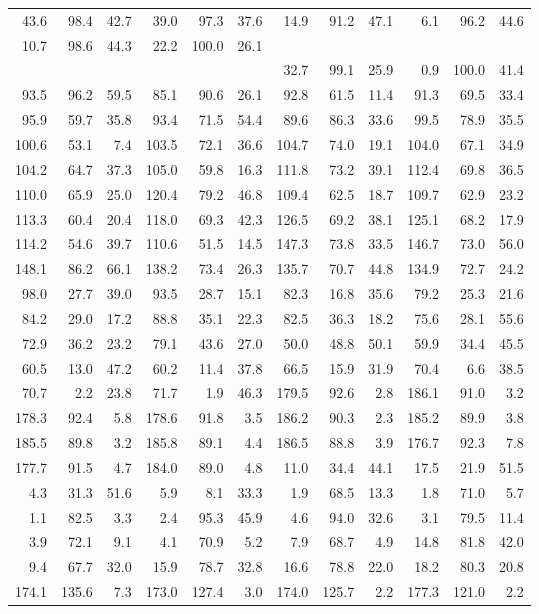 \documentclass[draft]{article}
\begin{document}
\begin{table}
\begin{center}
\begin{tabular}{rrrrrrrrrrrr}
 43.6& 98.4& 42.7& 39.0& 97.3& 37.6& 14.9& 91.2& 47.1&  6.1& 96.2& 44.6\\
 10.7& 98.6& 44.3& 22.2&100.0& 26.1\\
     &     &     &     &     &     & 32.7& 99.1& 25.9&  0.9&100.0& 41.4\\
 93.5& 96.2& 59.5& 85.1& 90.6& 26.1& 92.8& 61.5& 11.4& 91.3& 69.5& 33.4\\
 95.9& 59.7& 35.8& 93.4& 71.5& 54.4& 89.6& 86.3& 33.6& 99.5& 78.9& 35.5\\
100.6& 53.1&  7.4&103.5& 72.1& 36.6&104.7& 74.0& 19.1&104.0& 67.1& 34.9\\
104.2& 64.7& 37.3&105.0& 59.8& 16.3&111.8& 73.2& 39.1&112.4& 69.8& 36.5\\
110.0& 65.9& 25.0&120.4& 79.2& 46.8&109.4& 62.5& 18.7&109.7& 62.9& 23.2\\
113.3& 60.4& 20.4&118.0& 69.3& 42.3&126.5& 69.2& 38.1&125.1& 68.2& 17.9\\
114.2& 54.6& 39.7&110.6& 51.5& 14.5&147.3& 73.8& 33.5&146.7& 73.0& 56.0\\
148.1& 86.2& 66.1&138.2& 73.4& 26.3&135.7& 70.7& 44.8&134.9& 72.7& 24.2\\
 98.0& 27.7& 39.0& 93.5& 28.7& 15.1& 82.3& 16.8& 35.6& 79.2& 25.3& 21.6\\
 84.2& 29.0& 17.2& 88.8& 35.1& 22.3& 82.5& 36.3& 18.2& 75.6& 28.1& 55.6\\
 72.9& 36.2& 23.2& 79.1& 43.6& 27.0& 50.0& 48.8& 50.1& 59.9& 34.4& 45.5\\
 60.5& 13.0& 47.2& 60.2& 11.4& 37.8& 66.5& 15.9& 31.9& 70.4&  6.6& 38.5\\
 70.7&  2.2& 23.8& 71.7&  1.9& 46.3&179.5& 92.6&  2.8&186.1& 91.0&  3.2\\
178.3& 92.4&  5.8&178.6& 91.8&  3.5&186.2& 90.3&  2.3&185.2& 89.9&  3.8\\
185.5& 89.8&  3.2&185.8& 89.1&  4.4&186.5& 88.8&  3.9&176.7& 92.3&  7.8\\
177.7& 91.5&  4.7&184.0& 89.0&  4.8& 11.0& 34.4& 44.1& 17.5& 21.9& 51.5\\
  4.3& 31.3& 51.6&  5.9&  8.1& 33.3&  1.9& 68.5& 13.3&  1.8& 71.0&  5.7\\
  1.1& 82.5&  3.3&  2.4& 95.3& 45.9&  4.6& 94.0& 32.6&  3.1& 79.5& 11.4\\
  3.9& 72.1&  9.1&  4.1& 70.9&  5.2&  7.9& 68.7&  4.9& 14.8& 81.8& 42.0\\
  9.4& 67.7& 32.0& 15.9& 78.7& 32.8& 16.6& 78.8& 22.0& 18.2& 80.3& 20.8\\
174.1&135.6&  7.3&173.0&127.4&  3.0&174.0&125.7&  2.2&177.3&121.0&  2.2\\

\end{tabular}
\end{center}
\end{table}
\end{document}
